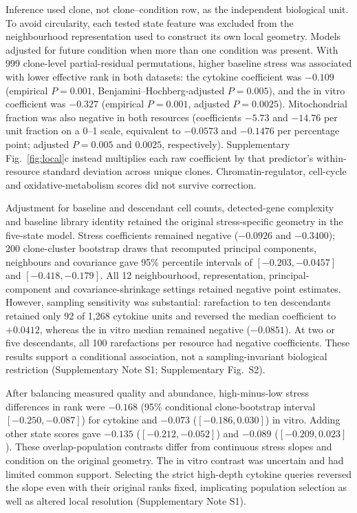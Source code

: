 \documentclass[a4paper,fleqn]{cas-sc}
\makeatletter
\DeclareRobustCommand{\rev}[1]{{\color{red}\def\@citecolor{black}\def\@linkcolor{red}\def\@urlcolor{red}#1}}
\makeatother
\begin{document}
Inference used clone, not clone--condition row, as the independent biological unit. To avoid circularity, each tested state feature was excluded from the neighbourhood representation used to construct its own local geometry. Models adjusted for future condition when more than one condition was present. With 999 clone-level partial-residual permutations, higher baseline stress was associated with lower effective rank in both datasets: the cytokine coefficient was $-0.109$ (empirical $P=0.001$, Benjamini--Hochberg-adjusted $P=0.005$), and the in vitro coefficient was $-0.327$ (empirical $P=0.001$, adjusted $P=0.0025$). Mitochondrial fraction was also negative in both resources (coefficients $-5.73$ and $-14.76$ per unit fraction on a 0--1 scale, equivalent to $-0.0573$ and $-0.1476$ per percentage point; adjusted $P=0.005$ and $0.0025$, respectively). \rev{Supplementary Fig.~\ref{fig:local}c instead multiplies each raw coefficient by that predictor's within-resource standard deviation across unique clones.} Chromatin-regulator, cell-cycle and oxidative-metabolism scores did not survive correction.

\rev{Adjustment for baseline and descendant cell counts, detected-gene complexity and baseline library identity retained the original stress-specific geometry in the five-state model.} Stress coefficients remained negative ($-0.0926$ and $-0.3400$); 200 clone-cluster bootstrap draws that recomputed principal components, neighbours and covariance gave 95\% percentile intervals of $[-0.203,-0.0457]$ and $[-0.418,-0.179]$. All 12 neighbourhood, representation, principal-component and covariance-shrinkage settings retained negative point estimates. However, sampling sensitivity was substantial: rarefaction to ten descendants retained only 92 of 1,268 cytokine units and reversed the median coefficient to $+0.0412$, whereas the in vitro median remained negative ($-0.0851$). At two or five descendants, all 100 rarefactions per resource had negative coefficients. These results support a conditional association, not a sampling-invariant biological restriction (Supplementary Note S1; Supplementary Fig.~S2).

After balancing measured quality and abundance, high-minus-low stress differences in rank were $-0.168$ (95\% conditional clone-bootstrap interval $[-0.250,-0.087]$) for cytokine and $-0.073$ ($[-0.186,0.030]$) in vitro. Adding other state scores gave $-0.135$ ($[-0.212,-0.052]$) and $-0.089$ ($[-0.209,0.023]$). These overlap-population contrasts differ from continuous stress slopes and condition on the original geometry. The in vitro contrast was uncertain and had limited common support. Selecting the strict high-depth cytokine queries reversed the slope even with their original ranks fixed, implicating population selection as well as altered local resolution (Supplementary Note S1).
\end{document}

